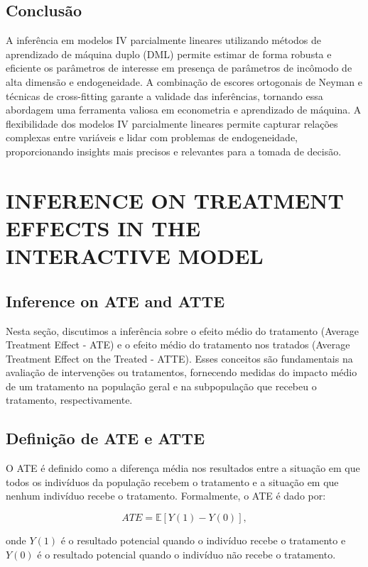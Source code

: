 \documentclass[a4paper,12pt]{article}[abntex2]
\begin{document}
\subsection*{Conclusão}

A inferência em modelos IV parcialmente lineares utilizando métodos de aprendizado de máquina duplo (DML) permite estimar de forma robusta e eficiente os parâmetros de interesse em presença de parâmetros de incômodo de alta dimensão e endogeneidade. A combinação de escores ortogonais de Neyman e técnicas de cross-fitting garante a validade das inferências, tornando essa abordagem uma ferramenta valiosa em econometria e aprendizado de máquina. A flexibilidade dos modelos IV parcialmente lineares permite capturar relações complexas entre variáveis e lidar com problemas de endogeneidade, proporcionando insights mais precisos e relevantes para a tomada de decisão.

\newpage


\section{INFERENCE ON TREATMENT EFFECTS IN THE INTERACTIVE MODEL}

\subsection{Inference on ATE and ATTE}

Nesta seção, discutimos a inferência sobre o efeito médio do tratamento (Average Treatment Effect - ATE) e o efeito médio do tratamento nos tratados (Average Treatment Effect on the Treated - ATTE). Esses conceitos são fundamentais na avaliação de intervenções ou tratamentos, fornecendo medidas do impacto médio de um tratamento na população geral e na subpopulação que recebeu o tratamento, respectivamente.

\subsection*{Definição de ATE e ATTE}

O ATE é definido como a diferença média nos resultados entre a situação em que todos os indivíduos da população recebem o tratamento e a situação em que nenhum indivíduo recebe o tratamento. Formalmente, o ATE é dado por:

\[
ATE = \mathbb{E}[Y(1) - Y(0)],
\]

onde $Y(1)$ é o resultado potencial quando o indivíduo recebe o tratamento e $Y(0)$ é o resultado potencial quando o indivíduo não recebe o tratamento.
\end{document}
